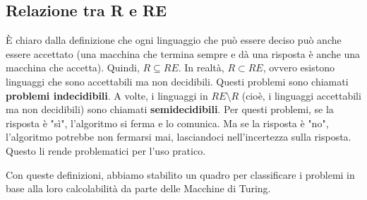 \documentclass[a4paper]{article}
\begin{document}
\subsection{Relazione tra R e RE}
È chiaro dalla definizione che ogni linguaggio che può essere deciso può anche essere accettato (una macchina che termina sempre e dà una risposta è anche una macchina che accetta). Quindi, $R \subseteq RE$.
In realtà, $R \subset RE$, ovvero esistono linguaggi che sono accettabili ma non decidibili. Questi problemi sono chiamati \textbf{problemi indecidibili}.
A volte, i linguaggi in $RE \setminus R$ (cioè, i linguaggi accettabili ma non decidibili) sono chiamati \textbf{semidecidibili}. Per questi problemi, se la risposta è "sì", l'algoritmo si ferma e lo comunica. Ma se la risposta è "no", l'algoritmo potrebbe non fermarsi mai, lasciandoci nell'incertezza sulla risposta. Questo li rende problematici per l'uso pratico.

Con queste definizioni, abbiamo stabilito un quadro per classificare i problemi in base alla loro calcolabilità da parte delle Macchine di Turing.
\end{document}
